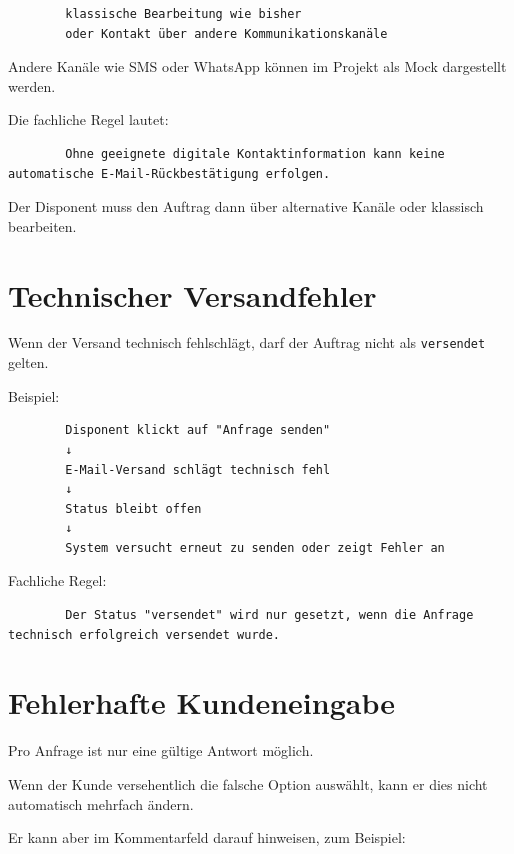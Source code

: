 \documentclass[12pt,a4paper]{article}
\begin{document}
	\begin{lstlisting}
		klassische Bearbeitung wie bisher
		oder Kontakt über andere Kommunikationskanäle
	\end{lstlisting}
	
	Andere Kanäle wie SMS oder WhatsApp können im Projekt als Mock dargestellt werden.
	
	Die fachliche Regel lautet:
	
	\begin{lstlisting}
		Ohne geeignete digitale Kontaktinformation kann keine automatische E-Mail-Rückbestätigung erfolgen.
	\end{lstlisting}
	
	Der Disponent muss den Auftrag dann über alternative Kanäle oder klassisch bearbeiten.
	
	\section{Technischer Versandfehler}
	
	Wenn der Versand technisch fehlschlägt, darf der Auftrag nicht als \texttt{versendet} gelten.
	
	Beispiel:
	
	\begin{lstlisting}
		Disponent klickt auf "Anfrage senden"
		↓
		E-Mail-Versand schlägt technisch fehl
		↓
		Status bleibt offen
		↓
		System versucht erneut zu senden oder zeigt Fehler an
	\end{lstlisting}
	
	Fachliche Regel:
	
	\begin{lstlisting}
		Der Status "versendet" wird nur gesetzt, wenn die Anfrage technisch erfolgreich versendet wurde.
	\end{lstlisting}
	
	\section{Fehlerhafte Kundeneingabe}
	
	Pro Anfrage ist nur eine gültige Antwort möglich.
	
	Wenn der Kunde versehentlich die falsche Option auswählt, kann er dies nicht automatisch mehrfach ändern.
	
	Er kann aber im Kommentarfeld darauf hinweisen, zum Beispiel:
	
\end{document}
